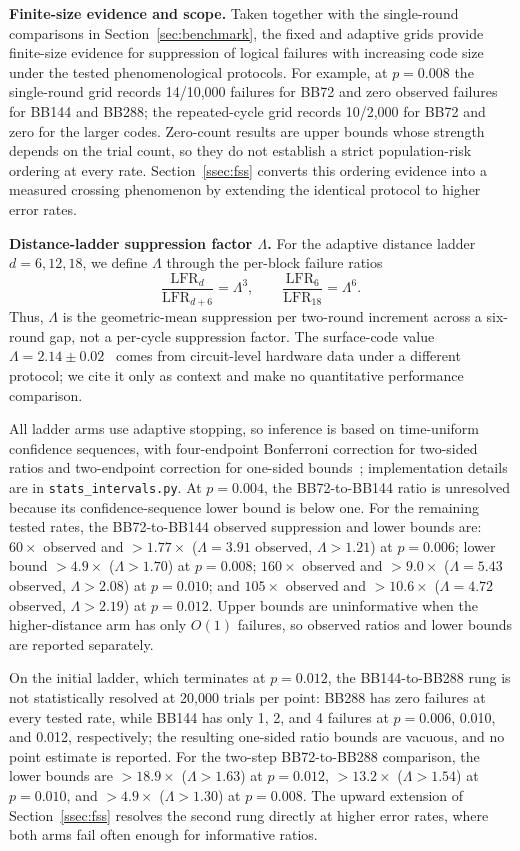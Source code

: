 \documentclass[pdflatex,sn-mathphys-num]{sn-jnl}
\theoremstyle{thmstyleone}
\theoremstyle{thmstyletwo}
\theoremstyle{thmstylethree}
\begin{document}
\noindent\textbf{Finite-size evidence and scope.} Taken together with the single-round comparisons in Section~\ref{sec:benchmark}, the fixed and adaptive grids provide finite-size evidence for suppression of logical failures with increasing code size under the tested phenomenological protocols. For example, at $p=0.008$ the single-round grid records 14/10{,}000 failures for BB72 and zero observed failures for BB144 and BB288; the repeated-cycle grid records 10/2{,}000 for BB72 and zero for the larger codes. Zero-count results are upper bounds whose strength depends on the trial count, so they do not establish a strict population-risk ordering at every rate. Section~\ref{ssec:fss} converts this ordering evidence into a measured crossing phenomenon by extending the identical protocol to higher error rates.

\noindent\textbf{Distance-ladder suppression factor \texorpdfstring{$\Lambda$}{Lambda}.} For the adaptive distance ladder $d=6,12,18$, we define $\Lambda$ through the per-block failure ratios
\[
\frac{\mathrm{LFR}_{d}}{\mathrm{LFR}_{d+6}}=\Lambda^3,
\qquad
\frac{\mathrm{LFR}_{6}}{\mathrm{LFR}_{18}}=\Lambda^6.
\]
Thus, $\Lambda$ is the geometric-mean suppression per two-round increment across a six-round gap, not a per-cycle suppression factor. The surface-code value $\Lambda=2.14\pm0.02$~\cite{Acharya2024lambda} comes from circuit-level hardware data under a different protocol; we cite it only as context and make no quantitative performance comparison.

All ladder arms use adaptive stopping, so inference is based on time-uniform confidence sequences, with four-endpoint Bonferroni correction for two-sided ratios and two-endpoint correction for one-sided bounds~\cite{howard2021confidence}; implementation details are in \texttt{stats\_intervals.py}. At $p=0.004$, the BB72-to-BB144 ratio is unresolved because its confidence-sequence lower bound is below one. For the remaining tested rates, the BB72-to-BB144 observed suppression and lower bounds are: $60\times$ observed and $>1.77\times$ ($\Lambda=3.91$ observed, $\Lambda>1.21$) at $p=0.006$; lower bound $>4.9\times$ ($\Lambda>1.70$) at $p=0.008$; $160\times$ observed and $>9.0\times$ ($\Lambda=5.43$ observed, $\Lambda>2.08$) at $p=0.010$; and $105\times$ observed and $>10.6\times$ ($\Lambda=4.72$ observed, $\Lambda>2.19$) at $p=0.012$. Upper bounds are uninformative when the higher-distance arm has only $O(1)$ failures, so observed ratios and lower bounds are reported separately.

On the initial ladder, which terminates at $p=0.012$, the BB144-to-BB288 rung is not statistically resolved at 20{,}000 trials per point: BB288 has zero failures at every tested rate, while BB144 has only 1, 2, and 4 failures at $p=0.006$, 0.010, and 0.012, respectively; the resulting one-sided ratio bounds are vacuous, and no point estimate is reported. For the two-step BB72-to-BB288 comparison, the lower bounds are $>18.9\times$ ($\Lambda>1.63$) at $p=0.012$, $>13.2\times$ ($\Lambda>1.54$) at $p=0.010$, and $>4.9\times$ ($\Lambda>1.30$) at $p=0.008$. The upward extension of Section~\ref{ssec:fss} resolves the second rung directly at higher error rates, where both arms fail often enough for informative ratios.
\end{document}
